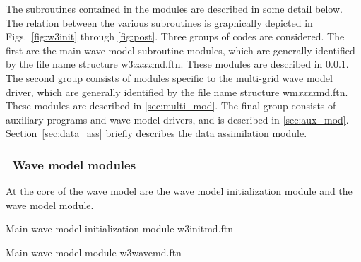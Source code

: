 The subroutines contained in the modules are described in some detail below.
The relation between the various subroutines is graphically depicted in
Figs.~\ref{fig:w3init} through \ref{fig:post}. Three groups of codes are
considered. The first are the main wave model subroutine modules, which are
generally identified by the file name structure {\file
w3{\it{xxxx}}md.ftn}. These modules are described in \para\ref{sec:wave_mod}.
The second group consists of modules specific to the multi-grid wave model
driver, which are generally identified by the file name structure {\file
wm{\it{xxxx}}md.ftn}. These modules are described in \para\ref{sec:multi_mod}.
The final group consists of auxiliary programs and wave model drivers, and is
described in \para\ref{sec:aux_mod}. Section~\ref{sec:data_ass} briefly
describes the data assimilation module.


\pb
\subsubsection{~Wave model modules} \label{sec:wave_mod}
\vsssub

At the core of the wave model are the wave model initialization module and the
wave model module.

\vspace{\baselineskip} \noindent
Main wave model initialization module \hfill {\file w3initmd.ftn}

\begin{flisti}
\end{flisti}

\vspace{\baselineskip} \noindent
Main wave model module \hfill {\file w3wavemd.ftn}

\begin{flisti}
\end{flisti}

